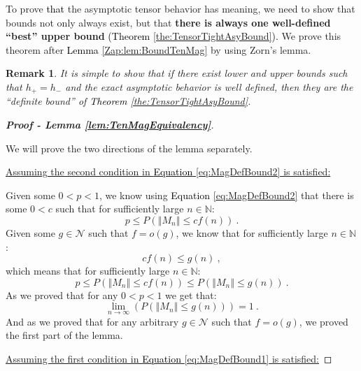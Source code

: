 \documentclass{article} %
\newtheorem{remark}{Remark}
[section]
\begin{document}
To prove \textcolor{black}{that} the asymptotic tensor behavior has meaning, we need to show that bounds not only always exist, but that \textbf{there is always one well-defined ``best'' upper bound} \textcolor{black}{(Theorem \ref{the:TensorTightAsyBound}).} We prove this theorem after \textcolor{black}{Lemma} \ref{Zap:lem:BoundTenMag} by using Zorn's lemma. 

\begin{remark}
\textup
{It is simple to show that if there exist lower and upper bounds such that \(h_+=h_-\) and the exact asymptotic behavior is well defined, then they are the ``definite bound'' of \textcolor{black}{Theorem} \ref{the:TensorTightAsyBound}.}
\end{remark}

\begin{proof}[\textbf{Proof - Lemma \ref{lem:TenMagEquivalency}}]
\

We will prove the two directions of the lemma separately.

\underline{Assuming the second condition in \textcolor{black}{Equation} \ref{eq:MagDefBound2} is satisfied:}

Given some \(0<p<1\), we know using \textcolor{black}{Equation} \ref{eq:MagDefBound2} that there is some \(0<c\) such that for sufficiently large \(n\in\mathbb{N}\):
\begin{equation}
p\leq P\left(\left\Vert M_n\right\Vert \leq cf\left(n\right)\right) \ .
\end{equation}
Given some \(g\in\mathcal{N}\) such that \(f=o(g)\), we know that for sufficiently large \(n\in\mathbb{N}\):
\begin{equation}
cf\left(n\right)\leq g\left(n\right) \ ,
\end{equation}
which means that for sufficiently large \(n\in\mathbb{N}\):
\begin{equation}
p\leq P\left(\left\Vert M_n\right\Vert \leq cf\left(n\right)\right)\leq P\left(\left\Vert M_n\right\Vert \leq g\left(n\right)\right) \ .
\end{equation}
As we proved that for any \(0<p<1\) we get that:
\begin{equation}
\lim_{n\rightarrow\infty}\left(P\left(\left\Vert M_n\right\Vert \leq g\left(n\right)\right)\right)=1 \ .
\end{equation}
And as we proved that for any arbitrary \(g\in\mathcal{N}\) such that \(f=o(g)\), we proved the first part of the lemma.

\underline{Assuming the first condition in \textcolor{black}{Equation} \ref{eq:MagDefBound1} is satisfied:}


\end{proof}
\end{document}
